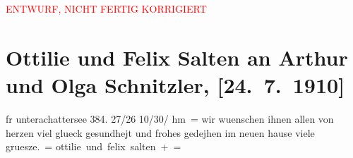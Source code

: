 
\begin{center}
            \textcolor{red}{ENTWURF, NICHT FERTIG KORRIGIERT}
                      \end{center}
            
         
         \renewcommand{\erwaehntePersonen}{Personen: Olga Schnitzler}
         \renewcommand{\erwaehnteOrte}{Orte: Unterach am Attersee, Wien}
         \renewcommand{\erwaehnteWerke}{}
               \section[Ottilie und Felix Salten an Arthur und Olga Schnitzler, {[}24. 7. 1910{]}]{ Ottilie und Felix Salten an Arthur und Olga Schnitzler, {[}24. 7. 1910{]}}\nopagebreak{}\rehead{ }\begin{ledgroupsized}[t]{13cm}\normalsize\beginnumbering \toendnotes[C]{\smallbreak\pagebreak[2]} 
\pstart
           \noindent{}{\pb}fr unterachattersee 384. 27/26 10/30/ hm =\pend
           \pstart
           wir wuenschen ihnen allen von herzen viel glueck gesundhejt und frohes gedejhen im
               neuen hause viele gruesze. = \pend
           \pstart
           \spacefill\mbox{ottilie und felix salten + =}\pend
           
         
         \endnumbering{}\end{ledgroupsized}\begin{anhang}\end{anhang}\newcommand{\dateiname}{L03550}\newcommand{\titel}{Ottilie und Felix Salten an Arthur und Olga Schnitzler, [24. 7. 1910]}\newcommand{\editorInnen}{Martin Anton Müller und Laura Untner}
      